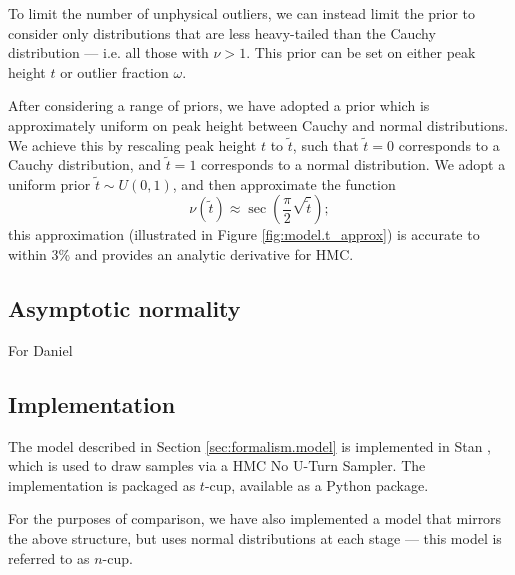 \documentclass[fleqn,usenatbib]{mnras}
\begin{document}
To limit the number of unphysical outliers, we can instead limit the prior to
consider only distributions that are less heavy-tailed than the Cauchy
distribution --- i.e. all those with $\nu > 1$. This prior can be set on either
peak height $t$ or outlier fraction $\omega$.


After considering a range of priors, we have adopted a prior which is
approximately uniform on peak height between Cauchy and normal distributions.
We achieve this by rescaling peak height $t$ to $\tilde{t}$, such that
$\tilde{t} = 0$ corresponds to a Cauchy distribution, and $\tilde{t} = 1$
corresponds to a normal distribution. We adopt a uniform prior $\tilde{t} \sim
U\left(0, 1\right)$, and then approximate the function
\begin{equation}
    \nu\left(\tilde{t}\right)
        \approx
    \sec \left(\frac{\pi}{2} \sqrt{\tilde{t}} \right);
    \label{eqn:model.t_approx}
\end{equation}
this approximation (illustrated in Figure \ref{fig:model.t_approx}) is accurate
to within 3\% and provides an analytic derivative for HMC.

\subsection{Asymptotic normality}
\label{sec:formalism.asymptotic}

{\color{green} For Daniel}

\subsection{Implementation}
\label{sec:formalism.implementation}

The model described in Section \ref{sec:formalism.model} is implemented in Stan
\citep{Stan}, which is used to draw samples via a HMC No U-Turn Sampler. The
implementation is packaged as $t$-cup, available as a Python
package\footnotemark.

For the purposes of comparison, we have also implemented a model that mirrors
the above structure, but uses normal distributions at each stage --- this model
is referred to as $n$-cup.
\end{document}

